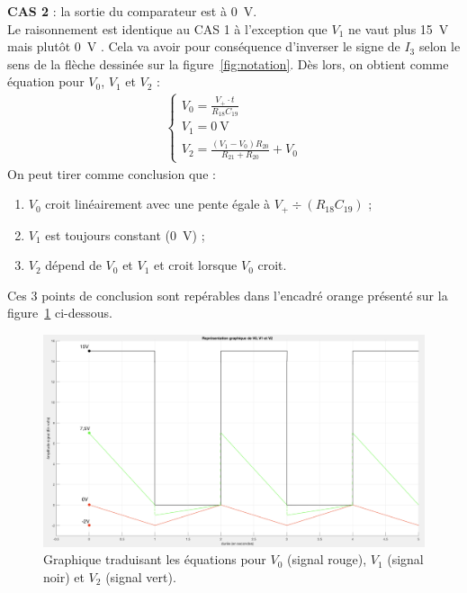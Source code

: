 \documentclass[10pt, oneside, a4paper]{article}
\begin{document}
\noindent\textbf{CAS 2} : la sortie du comparateur est à \SI{0}{\volt}. \\
Le raisonnement est identique au CAS 1 à l'exception que $V_1$ ne vaut plus \SI{15}{\volt} mais plutôt \SI{0}{\volt} .
Cela va avoir pour conséquence d'inverser le signe de $I_3$ selon le sens de la flèche dessinée sur la figure~\ref{fig:notation}.
Dès lors, on obtient comme équation pour $V_0$, $V_1$ et $V_2$ :
\begin{gather}
    \begin{cases}
        V_0 = \frac{V_+ \cdot t}{R_{18}C_{19}} \\
        V_1 = \SI{0}{\volt} \\
        V_{2} = \frac{(V_1 - V_0) R_{20}}{R_{21}+R_{20}} + V_0
    \end{cases}
\end{gather}
On peut tirer comme conclusion que :
\begin{enumerate}
\item $V_0$ croit linéairement avec une pente égale à $V_+ \div \left(R_{18} C_{19}\right)$ ;
\item $V_1$ est toujours constant (\SI{0}{\volt}) ;
\item $V_2$ dépend de $V_0$ et $V_1$ et croit lorsque $V_0$ croit.
\end{enumerate}
Ces 3 points de conclusion sont repérables dans l'encadré orange présenté sur la figure~\ref{fig:Graphe_Sigma_Delta}                ci-dessous. \\


\begin{figure}[!ht]
    \centering
    \includegraphics[width=\textwidth]{image/Sigma_Delta_Graphe.png}
    \caption{Graphique traduisant les équations pour $V_0$ (signal rouge), $V_1$ (signal noir) et $V_2$ (signal vert).}
    \label{fig:Graphe_Sigma_Delta}
\end{figure}
\newpage
\end{document}
